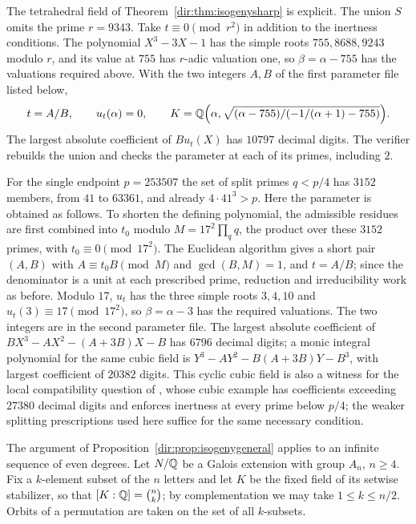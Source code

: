 \begin{remark}\label{dir:rem:sexticwitness}
The tetrahedral field of Theorem~\ref{dir:thm:isogenysharp} is explicit. The union $S$ omits
the prime $r=9343$. Take $t\equiv0\pmod{r^2}$ in addition to the inertness conditions.
The polynomial $X^3-3X-1$ has the simple roots $755,8688,9243$ modulo $r$, and its
value at $755$ has $r$-adic valuation one, so $\beta=\alpha-755$ has the valuations
required above. With the two integers $A,B$ of the first parameter file listed below,
\[
 t=A/B,\qquad u_t(\alpha)=0,\qquad
 K=\mathbb{Q}\Bigl(\alpha,\sqrt{(\alpha-755)/(-1/(\alpha+1)-755)}\Bigr).
\]
The largest absolute coefficient of $Bu_t(X)$ has $10797$ decimal digits. The verifier
rebuilds the union and checks the parameter at each of its primes, including $2$.

For the single endpoint $p=253507$ the set of split primes $q<p/4$ has $3152$ members,
from $41$ to $63361$, and already $4\cdot41^3>p$. Here the parameter is obtained as
follows. To shorten the defining polynomial, the admissible residues are first combined
into $t_0$ modulo $M=17^2\prod_qq$, the product over these $3152$ primes, with
$t_0\equiv0\pmod{17^2}$. The Euclidean algorithm gives a short pair $(A,B)$ with
$A\equiv t_0B\pmod M$ and $\gcd(B,M)=1$, and $t=A/B$; since the denominator is a unit at
each prescribed prime, reduction and irreducibility work as before. Modulo $17$, $u_t$
has the three simple roots $3,4,10$ and $u_t(3)\equiv17\pmod{17^2}$, so
$\beta=\alpha-3$ has the required valuations. The two integers are in the second
parameter file. The largest absolute coefficient of $BX^3-AX^2-(A+3B)X-B$ has $6796$ decimal digits; a monic integral
polynomial for the same cubic field is $Y^3-AY^2-B(A+3B)Y-B^3$, with largest
coefficient of $20382$ digits. This cyclic cubic field is also a witness for the local
compatibility question of \cite[Remark~A.14]{BanwaitDerickx2023Towards}, whose cubic
example has coefficients exceeding $27380$ decimal digits and enforces inertness at
every prime below $p/4$; the weaker splitting prescriptions used here suffice for the
same necessary condition.
\end{remark}

The argument of Proposition~\ref{dir:prop:isogenygeneral} applies to an infinite sequence of
even degrees. Let $N/\mathbb{Q}$ be a Galois extension with group $A_n$, $n\ge4$. Fix a
$k$-element subset of the $n$ letters and let $K$ be the fixed field of its setwise
stabilizer, so that $[K:\mathbb{Q}]=\binom nk$; by complementation we may take
$1\le k\le n/2$. Orbits of a permutation are taken on the set of all $k$-subsets.


